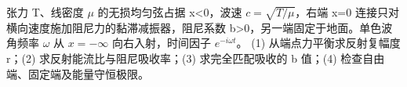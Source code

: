 张力 T、线密度 \(\mu\) 的无损均匀弦占据 x<0，波速 \(c=\sqrt{T/\mu}\)，右端 x=0 连接只对横向速度施加阻尼力的黏滞减振器，阻尼系数 b>0，另一端固定于地面。单色波角频率 \(\omega \) 从 \(x=-\infty \) 向右入射，时间因子 \(e^{-i\omega t}\)。
(1) 从端点力平衡求反射复幅度 r；(2) 求反射能流比与阻尼吸收率；(3) 求完全匹配吸收的 b 值；(4) 检查自由端、固定端及能量守恒极限。
